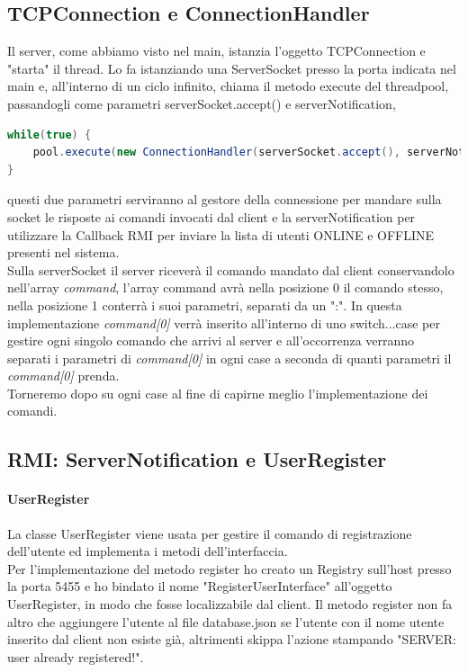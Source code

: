 \documentclass[]{article}
\begin{document}
\subsection{TCPConnection e ConnectionHandler}
Il server, come abbiamo visto nel main, istanzia l'oggetto TCPConnection e "starta" il thread.
Lo fa istanziando una ServerSocket presso la porta indicata nel main e, all'interno di un ciclo infinito, chiama il metodo execute del threadpool, passandogli come parametri serverSocket.accept() e serverNotification,
\begin{lstlisting}[language=java]
while(true) {
	pool.execute(new ConnectionHandler(serverSocket.accept(), serverNotification));
}
\end{lstlisting}
 questi due parametri serviranno al gestore della connessione per mandare sulla socket le risposte ai comandi invocati dal client e la serverNotification per utilizzare la Callback RMI per inviare la lista di utenti ONLINE e OFFLINE presenti nel sistema.\\
Sulla serverSocket il server riceverà il comando mandato dal client conservandolo nell'array \textit{command}, l'array command avrà nella posizione 0 il comando stesso, nella posizione 1 conterrà i suoi parametri, separati da un ":".
In questa implementazione \textit{command[0]} verrà inserito all'interno di uno switch...case per gestire ogni singolo comando che arrivi al server e all'occorrenza verranno separati i parametri di \textit{command[0]} in ogni case a seconda di quanti parametri il \textit{command[0]} prenda.\\
Torneremo dopo su ogni case al fine di capirne meglio l'implementazione dei comandi.
\subsection{RMI: ServerNotification e UserRegister}
\paragraph{UserRegister} La classe UserRegister viene usata per gestire il comando di registrazione dell'utente ed implementa i metodi dell'interfaccia. \\Per l'implementazione del metodo register ho creato un Registry sull'host presso la porta 5455 e ho bindato il nome "RegisterUserInterface" all'oggetto UserRegister, in modo che fosse localizzabile dal client. Il metodo register non fa altro che aggiungere l'utente al file database.json se l'utente con il nome utente inserito dal client non esiste già, altrimenti skippa l'azione stampando "SERVER: user already registered!".
\end{document}
